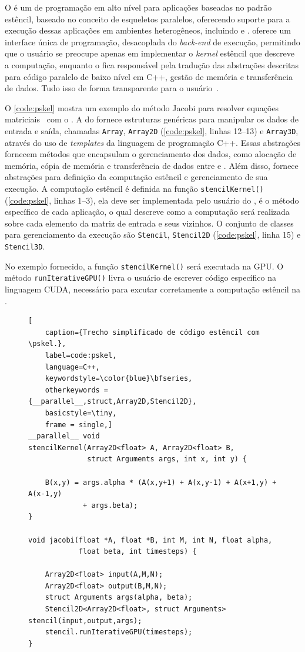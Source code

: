 O \pskel é um \fw de programação em alto nível para aplicações baseadas no
padrão estêncil, baseado no conceito de esqueletos paralelos, oferecendo suporte para a execução dessas aplicações em
ambientes heterogêneos, incluindo \cpu e \gpu. \pskel oferece um interface única de programação, desacoplada do \textit{back-end} de execução, permitindo que o usuário se preocupe apenas em implementar o \textit{kernel} estêncil que descreve a computação, enquanto o \fw fica responsável pela tradução das abstrações descritas para código paralelo de baixo nível em C++, gestão de memória e transferência de dados. Tudo isso de forma transparente para o usuário~\cite{CPE:CPE3479}.

O \autoref{code:pskel} mostra um exemplo do método Jacobi para resolver equações matriciais~\cite{demmel97} com o \pskel. A \api do \pskel fornece estruturas genéricas para manipular os dados de entrada e saída, chamadas \texttt{Array}, \texttt{Array2D} (\autoref{code:pskel}, linhas 12--13) e \texttt{Array3D}, através do uso de \textit{templates} da linguagem de programação C++. Essas abstrações fornecem métodos que encapsulam o gerenciamento dos dados, como alocação de memória, cópia de memória e transferência de dados entre \cpu e \gpu. Além disso, fornece abstrações para definição da computação estêncil e gerenciamento de sua execução. A computação estêncil é definida na função \texttt{stencilKernel()} (\autoref{code:pskel}, linhas 1--3), ela deve ser implementada pelo usuário do \pskel, é o método específico de cada aplicação, o qual descreve como a computação será realizada sobre cada elemento da matriz de entrada e seus vizinhos. O conjunto de classes para gerenciamento da execução são \texttt{Stencil}, \texttt{Stencil2D} (\autoref{code:pskel}, linha 15) e \texttt{Stencil3D}.

No exemplo fornecido, a função \texttt{stencilKernel()} será executada na GPU. O método \texttt{runIterativeGPU()} livra o usuário de escrever código específico na linguagem CUDA, necessário para excutar corretamente a computação estêncil na \gpu.

\begin{figure}
\begin{lstlisting}[
    caption={Trecho simplificado de código estêncil com \pskel.}, 
    label=code:pskel,
    language=C++,
    keywordstyle=\color{blue}\bfseries,
    otherkeywords = {__parallel__,struct,Array2D,Stencil2D}, 
    basicstyle=\tiny, 
    frame = single,]
__parallel__ void
stencilKernel(Array2D<float> A, Array2D<float> B, 
              struct Arguments args, int x, int y) {

    B(x,y) = args.alpha * (A(x,y+1) + A(x,y-1) + A(x+1,y) + A(x-1,y) 
             + args.beta);
}
        
void jacobi(float *A, float *B, int M, int N, float alpha, 
            float beta, int timesteps) {

    Array2D<float> input(A,M,N);
    Array2D<float> output(B,M,N);
    struct Arguments args(alpha, beta);
    Stencil2D<Array2D<float>, struct Arguments> stencil(input,output,args);
    stencil.runIterativeGPU(timesteps);
}
\end{lstlisting}
\end{figure}

